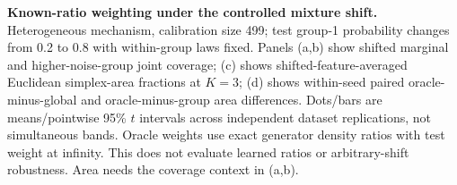 \textbf{Known-ratio weighting under the controlled mixture shift.} Heterogeneous mechanism, calibration size 499; test group-1 probability changes from 0.2 to 0.8 with within-group laws fixed. Panels (a,b) show shifted marginal and higher-noise-group joint coverage; (c) shows shifted-feature-averaged Euclidean simplex-area fractions at $K=3$; (d) shows within-seed paired oracle-minus-global and oracle-minus-group area differences. Dots/bars are means/pointwise 95\% $t$ intervals across independent dataset replications, not simultaneous bands. Oracle weights use exact generator density ratios with test weight at infinity. This does not evaluate learned ratios or arbitrary-shift robustness. Area needs the coverage context in (a,b).
